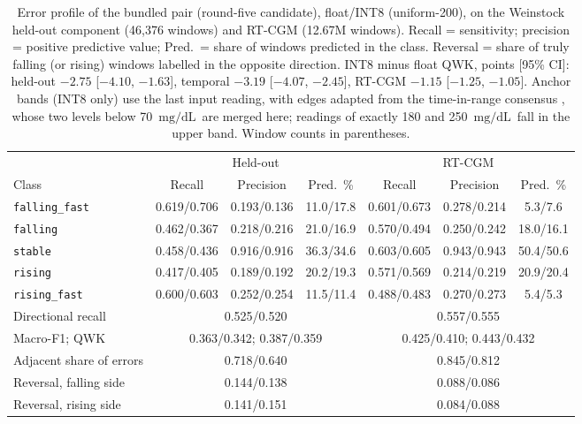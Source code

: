 \documentclass[10pt,twocolumn]{article}
\newcommand{\mgdl}{\ensuremath{\mathrm{mg/dL}}}
\begin{document}
\begin{table}[!tp]
\centering
\caption{Error profile of the bundled pair (round-five candidate), float/INT8
(uniform-200), on the Weinstock held-out component (46,376 windows) and
RT-CGM (12.67M windows). Recall = sensitivity; precision = positive
predictive value; Pred.\ = share of windows predicted in the class.
Reversal = share of truly falling (or rising) windows labelled in the
opposite direction. INT8 minus float QWK, points [95\% CI]: held-out
$-2.75$ [$-4.10$, $-1.63$], temporal $-3.19$ [$-4.07$, $-2.45$], RT-CGM
$-1.15$ [$-1.25$, $-1.05$]. Anchor bands (INT8 only) use the last input
reading, with edges adapted from the time-in-range consensus
\cite{battelino2019timeinrange}, whose two levels below 70~\mgdl\ are
merged here; readings of exactly 180 and 250~\mgdl\ fall in the upper
band. Window counts in parentheses.}
\label{tab:shippederrors}
\footnotesize
\setlength{\tabcolsep}{4pt}
\begin{tabular}{@{}lcccccc@{}}
\toprule
& \multicolumn{3}{c}{Held-out} & \multicolumn{3}{c}{RT-CGM} \\
\cmidrule(lr){2-4}\cmidrule(l){5-7}
Class & Recall & Precision & Pred.\ \% & Recall & Precision & Pred.\ \% \\
\midrule
\texttt{falling\_fast} & 0.619/0.706 & 0.193/0.136 & 11.0/17.8 & 0.601/0.673 & 0.278/0.214 & 5.3/7.6 \\
\texttt{falling}       & 0.462/0.367 & 0.218/0.216 & 21.0/16.9 & 0.570/0.494 & 0.250/0.242 & 18.0/16.1 \\
\texttt{stable}        & 0.458/0.436 & 0.916/0.916 & 36.3/34.6 & 0.603/0.605 & 0.943/0.943 & 50.4/50.6 \\
\texttt{rising}        & 0.417/0.405 & 0.189/0.192 & 20.2/19.3 & 0.571/0.569 & 0.214/0.219 & 20.9/20.4 \\
\texttt{rising\_fast}  & 0.600/0.603 & 0.252/0.254 & 11.5/11.4 & 0.488/0.483 & 0.270/0.273 & 5.4/5.3 \\
\midrule
Directional recall & \multicolumn{3}{c}{0.525/0.520} & \multicolumn{3}{c}{0.557/0.555} \\
Macro-F1; QWK & \multicolumn{3}{c}{0.363/0.342; 0.387/0.359} & \multicolumn{3}{c}{0.425/0.410; 0.443/0.432} \\
Adjacent share of errors & \multicolumn{3}{c}{0.718/0.640} & \multicolumn{3}{c}{0.845/0.812} \\
Reversal, falling side & \multicolumn{3}{c}{0.144/0.138} & \multicolumn{3}{c}{0.088/0.086} \\
Reversal, rising side & \multicolumn{3}{c}{0.141/0.151} & \multicolumn{3}{c}{0.084/0.088} \\

\end{tabular}
\end{table}
\end{document}
